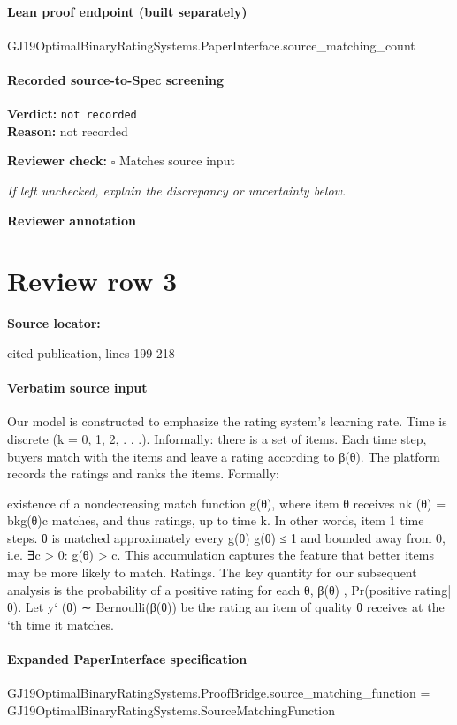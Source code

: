 \documentclass[10pt]{article}
\newcommand{\reviewerbox}{%
  \par\noindent\fbox{\parbox{0.96\linewidth}{\rule{0pt}{0.38in}}}\par
}
\newcommand{\reviewmatch}[1]{%
  \par\noindent\textbf{Reviewer check:} $\square$\; #1\par
  \noindent\emph{If left unchecked, explain the discrepancy or uncertainty below.}\par
}
\begin{document}
\paragraph{Lean proof endpoint (built separately)}\begin{ReviewVerbatim}
GJ19OptimalBinaryRatingSystems.PaperInterface.source_matching_count
\end{ReviewVerbatim}

\paragraph{Recorded source-to-Spec screening}
\textbf{Verdict:} \texttt{not recorded}
\\
\textbf{Reason:} not recorded
\reviewmatch{Matches source input}
\noindent\textbf{Reviewer annotation}\par
\reviewerbox
\clearpage
\hypertarget{source-claim-62613dce8c1c3874}{}
\section*{Review row 3}
\textbf{Source locator:} {\footnotesize\raggedright cited publication, lines 199-\allowbreak{}218\par}
\paragraph{Verbatim source input}
\begin{ReviewVerbatim}
Our model is constructed to emphasize the rating system’s learning rate. Time is discrete (k =
0, 1, 2, . . .). Informally: there is a set of items. Each
time step, buyers match with the items and leave a
rating according to β(θ). The platform records the
ratings and ranks the items. Formally:

existence of a nondecreasing match function g(θ),
where item θ receives nk (θ) = bkg(θ)c matches, and
thus ratings, up to time k. In other words, item
1
time steps.
θ is matched approximately every g(θ)
g(θ) ≤ 1 and bounded away from 0, i.e. ∃c > 0:
g(θ) > c. This accumulation captures the feature
that better items may be more likely to match.
Ratings. The key quantity for our subsequent
analysis is the probability of a positive rating for
each θ, β(θ) , Pr(positive rating|θ). Let y` (θ) ∼
Bernoulli(β(θ)) be the rating an item of quality θ
receives at the `th time it matches.
\end{ReviewVerbatim}


\paragraph{Expanded PaperInterface specification}
\begin{ReviewVerbatim}
GJ19OptimalBinaryRatingSystems.ProofBridge.source_matching_function =
  GJ19OptimalBinaryRatingSystems.SourceMatchingFunction
\end{ReviewVerbatim}
\end{document}
